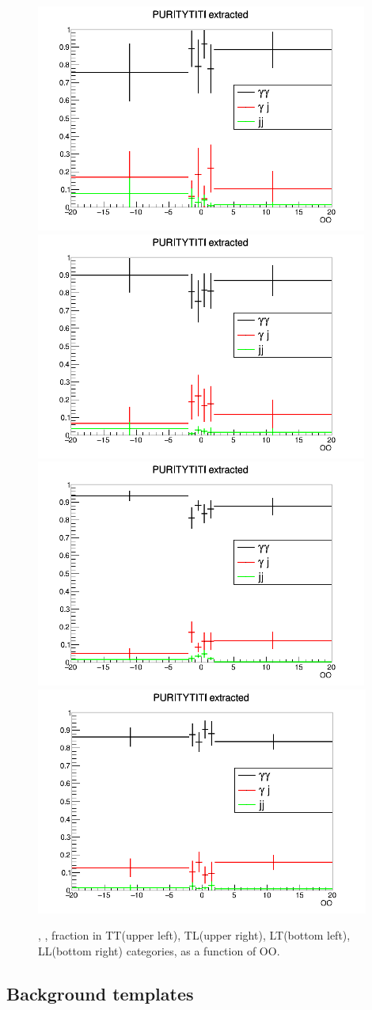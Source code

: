\begin{figure}[tbp]
  \centering
  \includegraphics[width=0.45\linewidth]{figure/bkgtmpls/TT/yyfrac_TT.png}
  \includegraphics[width=0.45\linewidth]{figure/bkgtmpls/TL/yyfrac_TL.png} \\
  \includegraphics[width=0.45\linewidth]{figure/bkgtmpls/LT/yyfrac_LT.png}
  \includegraphics[width=0.45\linewidth]{figure/bkgtmpls/LL/yyfrac_LL.png} 
  \caption{\yy, \yjet, \jetjet fraction in TT(upper left), TL(upper right), LT(bottom left), LL(bottom right) categories, as a function of OO. }
  \label{fig:yyfraction}
\end{figure}



\clearpage
\subsection{Background templates}
\label{ssec:bkg_templates}

